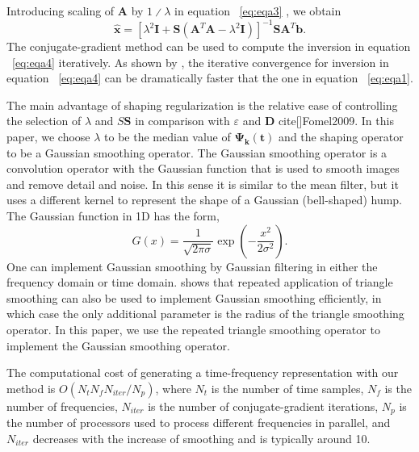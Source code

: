 Introducing scaling of $\mathbf{A}$ by $1∕λ$ in equation ~\ref{eq:eqa3} , we obtain
      \begin{equation}
          \hat{\mathbf{x}}=\left[\lambda ^{2}\mathbf{I}+\mathbf{S}\left(\mathbf{A}^{T}\mathbf{A}-\lambda ^{2}\mathbf{I}\right)\right]^{-1}\mathbf{S}\mathbf{A}^{T}\mathbf{b}.
        \label{eq:eqa4}
      \end{equation}
The conjugate-gradient method can be used to compute the inversion
in equation ~\ref{eq:eqa4} iteratively. As shown by \cite{Fomel2009}, the
iterative convergence for inversion in equation ~\ref{eq:eqa4} can be dramatically
faster that the one in equation ~\ref{eq:eqa1}.

The main advantage of shaping regularization is the relative ease
of controlling the selection of $\lambda$ and $S\mathbf{S}$ in comparison with $\varepsilon$ and $\mathbf{D}$
cite[]{Fomel2009}. In this paper, we choose $\lambda$ to be the median value of
$\mathbf{\Psi_{k}(t)}$ and the shaping operator to be a Gaussian smoothing operator.
The Gaussian smoothing operator is a convolution operator with
the Gaussian function that is used to smooth images and remove
detail and noise. In this sense it is similar to the mean filter, but
it uses a different kernel to represent the shape of a Gaussian
(bell-shaped) hump. The Gaussian function in 1D has the form,
      \begin{equation}
          G(x)=\frac{1}{\sqrt{2 \pi \sigma}} \exp \left( -\frac{x^{2}}{2\sigma^{2}}\right).
        \label{eq:eqa5}
      \end{equation}
One can implement Gaussian smoothing by Gaussian filtering in
either the frequency domain or time domain. \cite{Fomel2007b} shows
that repeated application of triangle smoothing can also be used to
implement Gaussian smoothing efficiently, in which case the only
additional parameter is the radius of the triangle smoothing
operator. In this paper, we use the repeated triangle smoothing operator
to implement the Gaussian smoothing operator.

The computational cost of generating a time-frequency representation
with our method is $O\left(N_{t}N_{f}N_{iter}/N_{p}\right)$, where $N_{t}$ is the number
of time samples, $N_{f}$ is the number of frequencies, $N_{iter}$ is the number
of conjugate-gradient iterations, $N_{p}$ is the number of processors
used to process different frequencies in parallel, and $N_{iter}$ decreases
with the increase of smoothing and is typically around 10.





